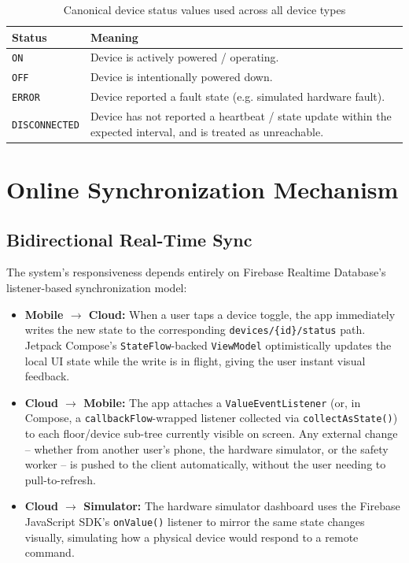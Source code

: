 \documentclass[11pt,a4paper]{article}
\begin{document}
\begin{table}[h!]
\centering
\begin{tabularx}{\textwidth}{lX}
\toprule
\textbf{Status} & \textbf{Meaning} \\
\midrule
\texttt{ON} & Device is actively powered / operating. \\
\texttt{OFF} & Device is intentionally powered down. \\
\texttt{ERROR} & Device reported a fault state (e.g. simulated hardware fault). \\
\texttt{DISCONNECTED} & Device has not reported a heartbeat / state update within the expected interval, and is treated as unreachable. \\
\bottomrule
\end{tabularx}
\caption{Canonical device status values used across all device types}
\end{table}

\newpage
\section{Online Synchronization Mechanism}

\subsection{Bidirectional Real-Time Sync}
The system's responsiveness depends entirely on Firebase Realtime Database's listener-based synchronization model:

\begin{itemize}
    \item \textbf{Mobile $\rightarrow$ Cloud:} When a user taps a device toggle, the app immediately writes the new state to the corresponding \texttt{devices/\{id\}/status} path. Jetpack Compose's \texttt{StateFlow}-backed \texttt{ViewModel} optimistically updates the local UI state while the write is in flight, giving the user instant visual feedback.
    \item \textbf{Cloud $\rightarrow$ Mobile:} The app attaches a \texttt{ValueEventListener} (or, in Compose, a \texttt{callbackFlow}-wrapped listener collected via \texttt{collectAsState()}) to each floor/device sub-tree currently visible on screen. Any external change -- whether from another user's phone, the hardware simulator, or the safety worker -- is pushed to the client automatically, without the user needing to pull-to-refresh.
    \item \textbf{Cloud $\rightarrow$ Simulator:} The hardware simulator dashboard uses the Firebase JavaScript SDK's \texttt{onValue()} listener to mirror the same state changes visually, simulating how a physical device would respond to a remote command.
\end{itemize}
\end{document}
